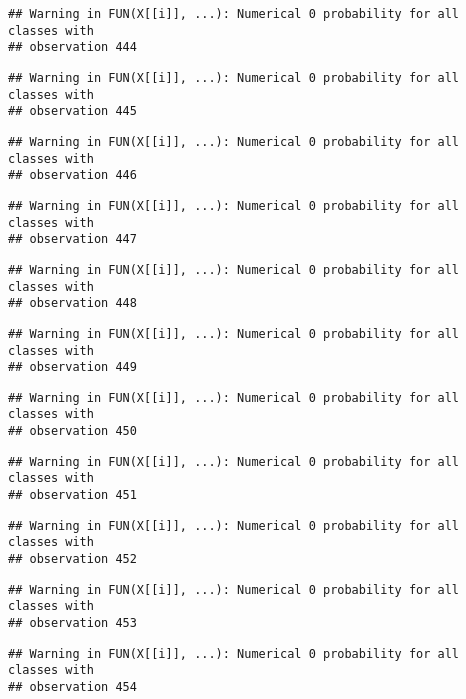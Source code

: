 \documentclass[
]{article}
\begin{document}
\begin{verbatim}
## Warning in FUN(X[[i]], ...): Numerical 0 probability for all classes with
## observation 444
\end{verbatim}

\begin{verbatim}
## Warning in FUN(X[[i]], ...): Numerical 0 probability for all classes with
## observation 445
\end{verbatim}

\begin{verbatim}
## Warning in FUN(X[[i]], ...): Numerical 0 probability for all classes with
## observation 446
\end{verbatim}

\begin{verbatim}
## Warning in FUN(X[[i]], ...): Numerical 0 probability for all classes with
## observation 447
\end{verbatim}

\begin{verbatim}
## Warning in FUN(X[[i]], ...): Numerical 0 probability for all classes with
## observation 448
\end{verbatim}

\begin{verbatim}
## Warning in FUN(X[[i]], ...): Numerical 0 probability for all classes with
## observation 449
\end{verbatim}

\begin{verbatim}
## Warning in FUN(X[[i]], ...): Numerical 0 probability for all classes with
## observation 450
\end{verbatim}

\begin{verbatim}
## Warning in FUN(X[[i]], ...): Numerical 0 probability for all classes with
## observation 451
\end{verbatim}

\begin{verbatim}
## Warning in FUN(X[[i]], ...): Numerical 0 probability for all classes with
## observation 452
\end{verbatim}

\begin{verbatim}
## Warning in FUN(X[[i]], ...): Numerical 0 probability for all classes with
## observation 453
\end{verbatim}

\begin{verbatim}
## Warning in FUN(X[[i]], ...): Numerical 0 probability for all classes with
## observation 454
\end{verbatim}
\end{document}
